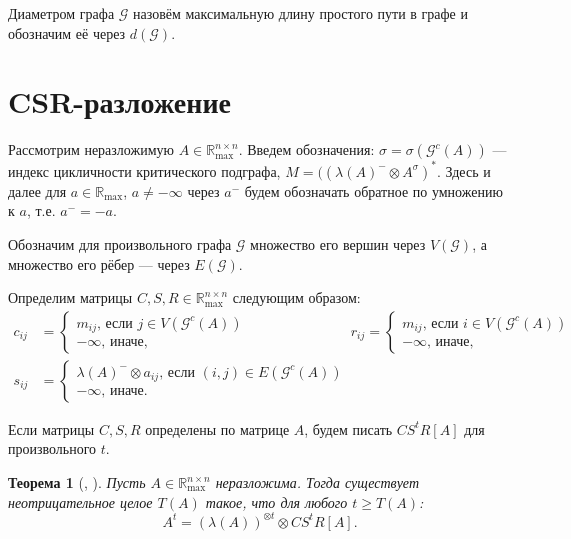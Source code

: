 \documentclass[12pt]{article}
\newtheorem{theorem}{Теорема}[section]
\begin{document}
Диаметром графа $\mathcal{G}$ назовём максимальную длину простого пути в графе и обозначим её через $d(\mathcal{G})$.

\section{CSR-разложение}
\label{CSR}
Рассмотрим неразложимую $A \in \mathbb{R}_{\max}^{n \times n}$. Введем обозначения: $\sigma = \sigma(\mathcal{G}^c(A))$ --- индекс цикличности критического подграфа, $M = ((\lambda(A)^-\otimes A^\sigma)^*$. Здесь и далее для $a \in \mathbb{R}_{\max}$, $a \ne -\infty$ через $a^-$ будем обозначать обратное по умножению к $a$, т.е. $a^- = -a$.

Обозначим для произвольного графа $\mathcal{G}$ множество его вершин через $V(\mathcal{G})$, а множество его рёбер --- через $E(\mathcal{G})$.

Определим матрицы $C, S, R \in \mathbb{R}_{\max}^{n \times n}$ следующим образом:
\begin{align*}
    c_{ij} &= \begin{cases}
        m_{ij}\text{, если } j \in V(\mathcal{G}^c(A)) \\
        -\infty \text{, иначе,}
    \end{cases}
    &
    r_{ij} = \begin{cases}
        m_{ij}\text{, если } i \in V(\mathcal{G}^c(A)) \\
        -\infty \text{, иначе,}
    \end{cases}
    \\
    s_{ij} &= \begin{cases}
        \lambda(A)^- \otimes a_{ij}\text{, если } (i, j) \in E(\mathcal{G}^c(A)) \\
        -\infty \text{, иначе.}
    \end{cases}
\end{align*}

Если матрицы $C, S, R$ определены по матрице $A$, будем писать $CS^tR[A]$ для произвольного $t$.
\begin{theorem}[\cite{bounds}, \cite{15WeakCSRExpantion}]
\label{theorem:CSRdecompositionTheorem}
Пусть $A \in \mathbb{R}_{\max}^{n \times n}$ неразложима. Тогда существует неотрицательное целое $T(A)$ такое, что для любого $t \ge T(A)$:
\begin{equation}
\label{equation:TDefinition}
    A^t = (\lambda(A))^{\otimes t} \otimes CS^tR[A].
\end{equation}
\end{theorem}
\end{document}
